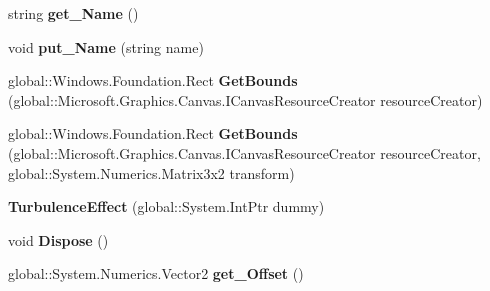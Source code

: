 \begin{DoxyCompactItemize}
string {\bfseries get\+\_\+\+Name} ()
\item 
\mbox{\label{class_microsoft_1_1_graphics_1_1_canvas_1_1_effects_1_1_turbulence_effect_aab356a0d7303f76e7c59e574c1b895f9}} 
void {\bfseries put\+\_\+\+Name} (string name)
\item 
\mbox{\label{class_microsoft_1_1_graphics_1_1_canvas_1_1_effects_1_1_turbulence_effect_a8a844736b9abd25959c5189938dc1e5f}} 
global\+::\+Windows.\+Foundation.\+Rect {\bfseries Get\+Bounds} (global\+::\+Microsoft.\+Graphics.\+Canvas.\+I\+Canvas\+Resource\+Creator resource\+Creator)
\item 
\mbox{\label{class_microsoft_1_1_graphics_1_1_canvas_1_1_effects_1_1_turbulence_effect_a3a6ab674e0ac6ee842030f2a1f7c0ad4}} 
global\+::\+Windows.\+Foundation.\+Rect {\bfseries Get\+Bounds} (global\+::\+Microsoft.\+Graphics.\+Canvas.\+I\+Canvas\+Resource\+Creator resource\+Creator, global\+::\+System.\+Numerics.\+Matrix3x2 transform)
\item 
\mbox{\label{class_microsoft_1_1_graphics_1_1_canvas_1_1_effects_1_1_turbulence_effect_a7138fc554faf8edbe9dd225b0d269fa1}} 
{\bfseries Turbulence\+Effect} (global\+::\+System.\+Int\+Ptr dummy)
\item 
\mbox{\label{class_microsoft_1_1_graphics_1_1_canvas_1_1_effects_1_1_turbulence_effect_a8b22105827e76c8c48ec956365234137}} 
void {\bfseries Dispose} ()
\item 
\mbox{\label{class_microsoft_1_1_graphics_1_1_canvas_1_1_effects_1_1_turbulence_effect_a1f221cd27052403cf998ee30e9b25788}} 
global\+::\+System.\+Numerics.\+Vector2 {\bfseries get\+\_\+\+Offset} ()
\item 
\mbox{\label{class_microsoft_1_1_graphics_1_1_canvas_1_1_effects_1_1_turbulence_effect_af1bf86f6255767db3f111cbb6184b538}} 

\end{DoxyCompactItemize}
